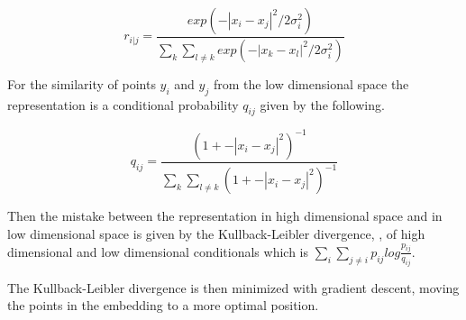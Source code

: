 \begin{equation} \label{pij}
    r_{i|j}=\frac{exp(-|x_{i}-x_{j}|^2/2\sigma_{i}^2)}{\sum_{k}\sum_{l\neq k} exp(-|x_{k}-x_{l}|^2/2\sigma_{i}^2)}
\end{equation}

For the similarity of points $y_{i}$ and $y_{j}$ from the low dimensional space the representation is a conditional
probability $q_{ij}$ given by the following.

\begin{equation} \label{qij}
    q_{ij}=\frac{(1 + -|x_{i}-x_{j}|^2)^{-1}}{\sum_{k}\sum_{l\neq k} (1 + -|x_{i}-x_{j}|^2)^{-1}}
\end{equation}

Then the mistake between the representation in high dimensional space and in low dimensional space is
given by the Kullback-Leibler divergence, , of high dimensional and low dimensional
conditionals which is $\sum_{i}\sum_{j\neq i}p_{ij}log \frac{p_{ij}}{q_{ij}}$.

The Kullback-Leibler divergence is then minimized with gradient descent, moving the points in the embedding to
a more optimal position.